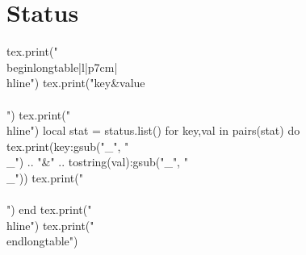 \documentclass{article}
\begin{document}
\section*{Status}

\begin{luacode*}
tex.print("\\begin{longtable}{|l|p{7cm}|}\\hline")
tex.print("key&value\\\\")
tex.print("\\hline")
local stat = status.list()
for key,val in pairs(stat) do
    tex.print(key:gsub("_", "\\_") .. "&" .. tostring(val):gsub("_", "\\_"))
    tex.print("\\\\")
end
tex.print("\\hline")
tex.print("\\end{longtable}")
\end{luacode*}
\end{document}
